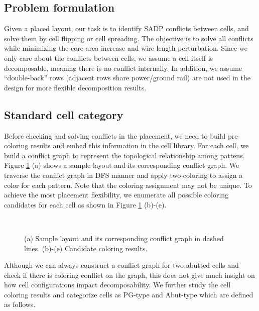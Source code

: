 {\color{red}
}

\subsection{Problem formulation}
Given a placed layout, our task is to identify SADP conflicts between cells, and solve them by cell flipping or cell spreading. The objective is to solve all conflicts while minimizing the core area increase and wire length perturbation. Since we only care about the conflicts between cells, we assume a cell itself is decomposable, meaning there is no conflict internally. In addition, we assume ``double-back'' rows (adjacent rows share power/ground rail) are not used in the design for more flexible decomposition results.

\subsection{Standard cell category}
Before checking and solving conflicts in the placement, we need to build pre-coloring results and embed this information in the cell library. For each cell, we build a conflict graph to represent the topological relationship among pattens. Figure \ref{fig:color_ex} (a) shows a sample layout and its corresponding conflict graph. We traverse the conflict graph in DFS manner and apply two-coloring to assign a color for each pattern. Note that the coloring assignment may not be unique. To achieve the most placement flexibility, we enumerate all possible coloring candidates for each cell as shown in Figure \ref{fig:color_ex} (b)-(e). 

\begin{figure}[b]
\centering
\mbox{
\hspace{0.20in}
\hspace{0.20in}
\hspace{0.20in}
\hspace{0.20in}
}
\caption{(a) Sample layout and its corresponding conflict graph in dashed lines. (b)-(e) Candidate coloring results.}
  \label{fig:color_ex}
\end{figure}

Although we can always construct a conflict graph for two abutted cells and check if there is coloring conflict on the graph, this does not give much insight on how cell configurations impact decomposability. We further study the cell coloring results and categorize cells as PG-type and Abut-type which are defined as follows.

